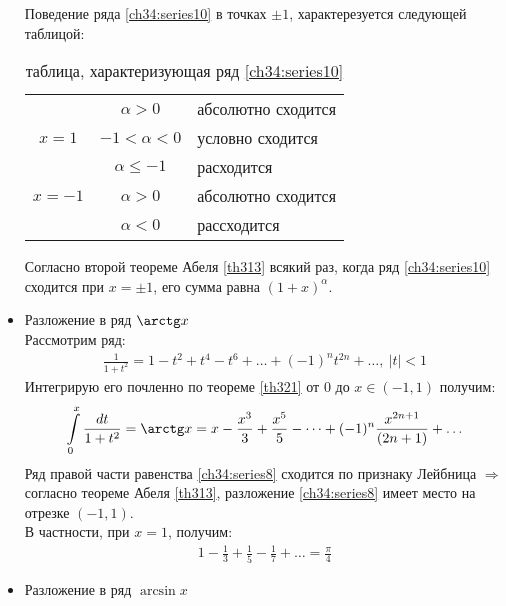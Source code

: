 \begin{itemize}
    \begin{remark}
      Поведение ряда \eqref{ch34:series10} в точках $\pm 1$, характерезуется
      следующей таблицой:
      \begin{table}[H]
        \caption{таблица, характеризующая ряд \eqref{ch34:series10}}
        \begin{center}
          \begin{tabular}{|c|c|l|}
            \hline
            & $\alpha > 0$ & абсолютно сходится \\
            $x = 1$ & $-1 < \alpha < 0$ & условно сходится \\
            & $\alpha \leq -1$ & расходится\\
            \hline
            $x = -1$ & $ \alpha > 0$ & абсолютно сходится \\
            & $\alpha < 0$ & рассходится \\
            \hline
          \end{tabular}
        \end{center}
      \end{table}
      Согласно второй теореме Абеля \eqref{th313} всякий раз, когда ряд
      \eqref{ch34:series10} сходится при $x = \pm 1$, его сумма равна $(1 +
      x)^\alpha$.
    \end{remark}
  \item Разложение в ряд $\arctg x$ \\
    Рассмотрим ряд:
    \begin{gather}
      \frac{1}{1 + t^2} = 1 - t^2 + t^4 - t^6 + \dots + (-1)^n t^{2n} + \dots, \ |t| < 1
    \end{gather}
    Интегрирую его почленно по теореме \eqref{th321} от $0$ до $x \in (-1, 1)$
    получим:
    \begin{gather*}
      \int\limits_0^x \frac{dt}{1+t^2} = \arctg x = x - \frac{x^3}{3} +
      \frac{x^5}{5} - \dots + (-1)^n \frac{x^{2n+1}}{(2n+1)} + \dots
    \end{gather*}
    Ряд правой части равенства \eqref{ch34:series8} сходится по признаку Лейбница
    $\Rightarrow$ согласно теореме Абеля \eqref{th313}, разложение
    \eqref{ch34:series8} имеет место на отрезке $(-1, 1)$. \\
    В частности, при $x = 1$, получим:
    \begin{gather*}
      1 - \frac{1}{3} + \frac{1}{5} - \frac{1}{7} + \dots = \frac{\pi}{4}
    \end{gather*}
  \item Разложение в ряд $\arcsin x$ \\

\end{itemize}
